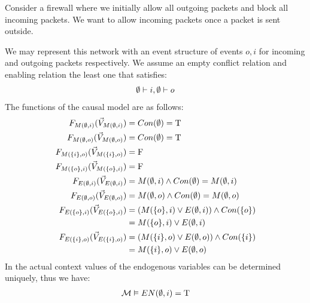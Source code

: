 \begin{example}
    Consider a firewall where we initially allow all outgoing packets and block all incoming packets.
    We want to allow incoming packets once a packet is sent outside.
    \begin{center}
    \end{center}
    We may represent this network with an event structure of
    events $o,i$ for incoming and outgoing packets respectively.
    We assume an empty conflict relation and enabling relation
    the least one that satisfies:
    \begin{align*}
        \emptyset \vdash i, \emptyset \vdash o
    \end{align*}
    The functions of the causal model are as follows:
    \begin{align*}
        F_{M(\emptyset,i)}(\vec V_{M(\emptyset,i)})    & = Con(\emptyset) = \mathrm{T}                           \\
        F_{M(\emptyset,o)}(\vec V_{M(\emptyset,o)})    & = Con(\emptyset) = \mathrm{T}                           \\
        F_{M(\{i\},o)}(\vec V_{M(\{i\},o)}) & = \mathrm{F}                                     \\
        F_{M(\{o\},i)}(\vec V_{M(\{o\},i)}) & = \mathrm{F}                                     \\
        F_{E(\emptyset,i)}(\vec V_{E(\emptyset,i)})    & = M(\emptyset,i) \wedge Con(\emptyset) = M(\emptyset,i)       \\
        F_{E(\emptyset,o)}(\vec V_{E(\emptyset,o)})    & = M(\emptyset,o) \wedge Con(\emptyset) = M(\emptyset,o)       \\
        F_{E(\{o\},i)}(\vec V_{E(\{o\},i)}) & =
        \left( M(\{o\},i) \vee E(\emptyset,i)  \right) \wedge Con(\{o\}) \\
                       & = M(\{o\},i) \vee E(\emptyset,i)                \\
        F_{E(\{i\},o)}(\vec V_{E(\{i\},o)}) & =
        \left( M(\{i\},o) \vee E(\emptyset,o) \right)
        \wedge Con(\{i\})                                         \\
                       & = M(\{i\},o) \vee E(\emptyset,o)                \\
    \end{align*}
    In the actual context values of the endogenous variables can be
    determined uniquely, thus we have:
    \begin{align*}
        \m & \vDash EN(\e,i) = \T    \\

\end{align*}
\end{example}
